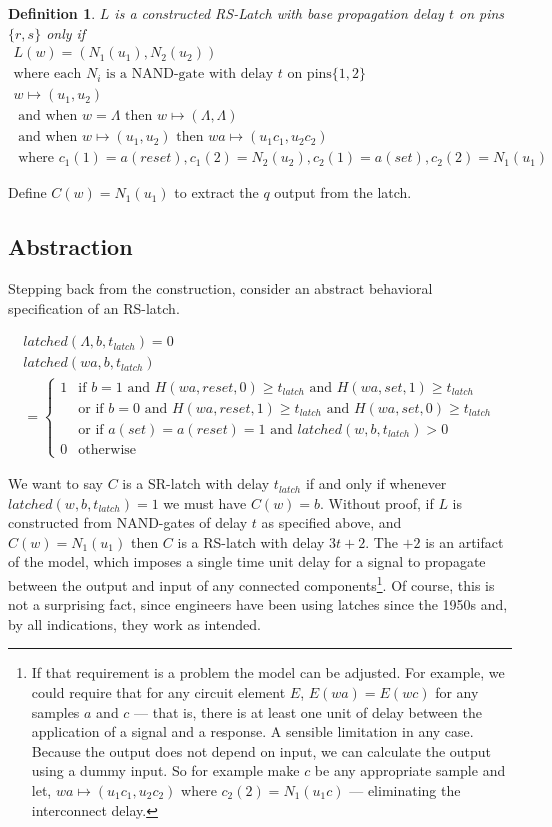 \documentclass[runningheads,letter]{llncs}
\newcommand{\set}[1]{\{#1\}}
\newcommand{\ess}{\Lambda}
\newcommand{\Bfunc}{\left\{\begin{array}{ll}}
\newcommand{\Efunc}{\end{array}\right.}
\newtheorem{dfn}{Definition}[section]
\begin{document}
\begin{dfn} $L$ is a constructed RS-Latch with base propagation delay $t$
on pins $\set{r,s}$ only if
\begin{eqnarray}
L(w) = (N_1(u_1), N_2(u_2))\\
\mbox{where each }N_i\mbox{ is a NAND-gate with delay }t\mbox{ on pins}\set{1,2}\\
w\mapsto (u_1,u_2)\\
\mbox{ and when }w=\ess\mbox{ then }w\mapsto (\ess,\ess)\\
\mbox{ and when }w\mapsto (u_1,u_2)\mbox{ then }wa\mapsto (u_1c_1,u_2c_2)\\
\mbox{ where }c_1(1)=a(reset), c_1(2)= N_2(u_2), c_2(1)=a(set), c_2(2)= N_1(u_1)
\end{eqnarray}
\end{dfn}

Define $C(w) = N_1(u_1)$ to extract the $q$ output from the latch.

\subsection{Abstraction}
Stepping back from the construction, consider an abstract behavioral specification of an RS-latch.

\begin{eqnarray}
latched(\ess,b,t_{latch}) = 0\\
latched(wa,b,t_{latch}) \\
=\Bfunc
	1&\mbox{if }b=1\mbox{ and }H(wa,reset,0)\geq t_{latch}\mbox{ and } H(wa,set,1)\geq t_{latch}\\
	&\mbox{or if }b=0\mbox{ and }H(wa,reset,1)\geq t_{latch}\mbox{ and } H(wa,set,0)\geq t_{latch}\\
&\mbox{or if }a(set)=a(reset)=1\mbox{ and }latched(w,b,t_{latch})>0\\	
	0&\mbox{otherwise}\Efunc\nonumber
\end{eqnarray}

We want to say $C$ is a SR-latch with delay $t_{latch}$ if and only if
whenever $latched(w,b,t_{latch})=1$ we must have $C(w)=b$.
Without proof, if $L$ is constructed from NAND-gates of delay $t$ as specified above, and $C(w)=N_1(u_1)$ then
$C$ is a RS-latch with delay $3t+2$. The $+2$ is an artifact of the model, which imposes a single
time unit delay for a signal to propagate between the output and input of any connected components\footnote{ 
If that requirement is a problem the model can be adjusted. For example, we could require that for any circuit element $E$, $E(wa)=E(wc)$ for any
samples $a$ and $c$ --- that is, there is at least one unit of delay between
the application of a signal and a response. A sensible limitation in any case.
Because the output does not depend on input, we can calculate the output using a dummy input.
So for example make $c$ be any appropriate sample and let, $wa\mapsto (u_1c_1,u_2c_2)$ where $c_2(2)=N_1(u_1c)$
--- eliminating the interconnect delay.}.
Of course, this is not a surprising fact,
since engineers have been using latches since the 1950s and, by all indications, they work as intended.
\end{document}
